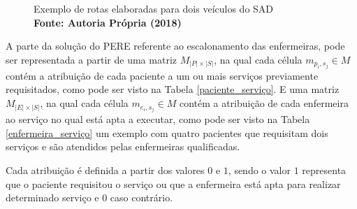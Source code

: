 \begin{figure}[H]
\centering
\begin{center}
\end{center}
\caption{Exemplo de rotas elaboradas para dois veículos do \ac{SAD} 
\\ \textbf{\footnotesize Fonte: Autoria Própria (2018)}
}
\label{grafo1}
\end{figure}


A parte da solução do \ac{PERE} referente ao escalonamento das enfermeiras, pode ser representada a partir de uma matriz $M_{|P|\times |S|}$, na qual cada célula $m_{p_i,s_j} \in M$ contém a atribuição de cada paciente a um ou mais serviços previamente requisitados, como pode ser visto na Tabela \ref{paciente_serviço}.
E uma matriz $M_{|E|\times |S|}$, na qual cada célula $m_{e_i,s_j} \in M$ contém a atribuição de cada enfermeira ao serviço no qual está apta a executar, como pode ser visto na Tabela \ref{enfermeira_serviço} um exemplo com quatro pacientes que requisitam dois serviços e são atendidos pelas enfermeiras qualificadas.

Cada atribuição é definida a partir dos valores $0$ e $1$, sendo o valor $1$ representa que o paciente requisitou o serviço ou que a enfermeira está apta para realizar determinado serviço e $0$ caso contrário. \\



